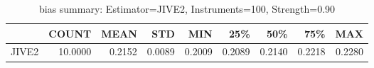 \begin{table}[ht]
\centering
\caption{bias summary: Estimator=JIVE2, Instruments=100, Strength=0.90}
\begin{tabular}{lrrrrrrrr}
\toprule
 & COUNT & MEAN & STD & MIN & 25\% & 50\% & 75\% & MAX \\
\midrule
JIVE2 & 10.0000 & 0.2152 & 0.0089 & 0.2009 & 0.2089 & 0.2140 & 0.2218 & 0.2280 \\
\bottomrule
\end{tabular}
\end{table}
